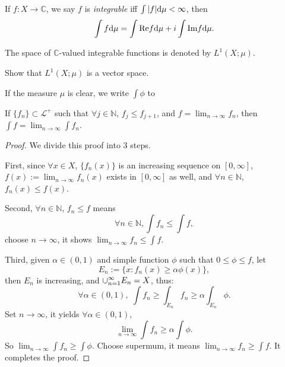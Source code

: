 \begin{defn}
    \label{Defn:ComplexValuedFuncInt}
    If $f:X\rightarrow\mathbb{C}$, we say $f$ is \textit{integrable} 
    iff $\int|f|\mathrm{d}\mu<\infty$, then 
    \begin{displaymath}
        \int f\mathrm{d}\mu=\int \text{Re}f\mathrm{d}\mu+i\int\text{Im}f\mathrm{d}\mu.
    \end{displaymath}
\end{defn}
\begin{defn}
    \label{Defn:L1space}
    The space of $\mathbb{C}$-valued integrable functions 
    is denoted by $L^{1}(X;\mu)$.
\end{defn}
\begin{exc}
    Show that $L^{1}(X;\mu)$ is a vector space.
\end{exc}
\begin{ntn}
    If the measure $\mu$ is clear, 
    we write $\int\phi$ to 
\end{ntn}
\begin{thm}
    \label{Thm:MCT}
    If $\{f_{n}\}\subset\mathcal{L}^{+}$ such that 
    $\forall j\in\mathbb{N}$, $f_j\le f_{j+1}$, and 
    $f=\lim_{n\rightarrow\infty}f_{n}$, then 
    $\int f=\lim_{n\rightarrow\infty}\int f_n$.
\end{thm}
\begin{proof}
    We divide this proof into 3 steps. 

    First, since $\forall x\in X$, $\{f_{n}(x)\}$ is an increasing 
    sequence on $[0,\infty]$, $f(x):=\lim_{n\rightarrow\infty}f_{n}(x)$ 
    exists in $[0,\infty]$ as well, and $\forall n\in\mathbb{N}$, 
    $f_{n}(x)\le f(x)$.

    Second, $\forall n\in\mathbb{N}$, $f_{n}\le f$ means 
    \begin{displaymath}
        \forall n\in\mathbb{N}, \int f_{n}\le\int f,
    \end{displaymath}
    choose $n\rightarrow\infty$, 
    it shows $\lim_{n\rightarrow\infty}f_{n}\le\int f$.

    Third, given $\alpha\in(0,1)$ and simple function $\phi$ 
    such that $0\le\phi\le f$, let 
    \begin{displaymath}
        E_n:=\{x:f_{n}(x)\ge\alpha\phi(x)\},
    \end{displaymath}
    then $E_{n}$ is increasing, and $\cup_{n=1}^{\infty}E_n=X$, thus:
    \begin{displaymath}
        \forall\alpha\in(0,1),\;
        \int f_n\ge\int_{E_n}f_{n}\ge\alpha\int_{E_n}\phi.
    \end{displaymath}
    Set $n\rightarrow\infty$, it yields $\forall\alpha\in(0,1)$, 
    \begin{displaymath}
        \lim_{n\rightarrow\infty}\int f_n\ge\alpha\int\phi.
    \end{displaymath}
    So $\lim_{n\rightarrow\infty}\int f_n\ge\int\phi$. 
    Choose supermum, it means 
    $\lim_{n\rightarrow\infty}f_n\ge\int f$. 
    It completes the proof.
\end{proof}
